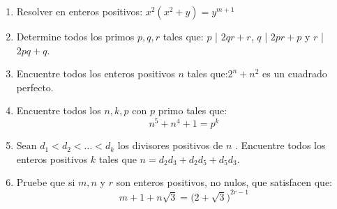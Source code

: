 \documentclass{book}
\begin{document}
\begin{enumerate}
		\item Resolver en enteros positivos: $x^2(x^2+y)=y^{m+1}$
		\item Determine todos los primos $p,q,r$ tales que: $p$ | $2qr+r$, $q$ | $2pr+p$ y $r$ | $2pq+q$.
		\item Encuentre todos los enteros positivos $n$ tales que:$2^n+n^2$ es un cuadrado perfecto.
		\item Encuentre todos los $n,k,p$ con $p$ primo tales que:
			$$n^5+n^4+1=p^k$$
		\item Sean $d_1<d_2< \ldots  <d_k$  los divisores positivos de $n$ . Encuentre todos los enteros positivos $k$  tales que 	            		$n=d_2d_3+d_2d_5+d_5d_3$.
		\item Pruebe que si $m,n$  y $r$  son enteros positivos, no nulos, que satisfacen que:  
			$$m+1+n\sqrt{3}={\big(2+\sqrt{3}\big)}^{2r-1}$$ 
	\end{enumerate}
	\newpage
	
\end{document}
